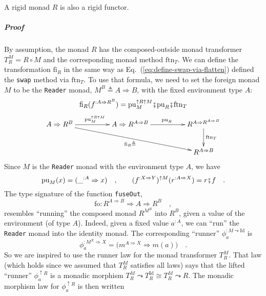 A rigid monad $R$ is also a rigid functor.

\subparagraph{Proof}

By assumption, the monad $R$ has the composed-outside monad transformer
$T_{R}^{M}=R\circ M$ and the corresponding monad method $\text{ftn}_{T}$.
We can define the transformation $\text{fi}_{R}$ in the same way
as Eq.~(\ref{eq:define-swap-via-flatten}) defined the \lstinline!swap!
method via $\text{ftn}_{T}$. To use that formula, we need to set
the foreign monad $M$ to be the \lstinline!Reader!
monad, $M^{B}\triangleq A\Rightarrow B$, with the fixed environment
type $A$:
\begin{equation}
\text{fi}_{R}(f^{:A\Rightarrow R^{B}})=\text{pu}_{M}^{\uparrow R\uparrow M}\bef\text{pu}_{R}\bef\text{ftn}_{T}\label{eq:rigid-monad-fuseIn-def}
\end{equation}
\[
\xymatrix{\xyScaleY{2pc}\xyScaleX{4pc}A\Rightarrow R^{B}\ar[r]\sp(0.5){\text{pu}_{M}^{\uparrow R\uparrow M}}\ar[rrd]\sb(0.5){\text{fi}_{R}\triangleq} & A\Rightarrow R^{A\Rightarrow B}\ar[r]\sp(0.5){\text{pu}_{R}} & R^{A\Rightarrow R^{A\Rightarrow B}}\ar[d]\sp(0.45){\text{ftn}_{T}}\\
 &  & R^{A\Rightarrow B}
}
\]
Since $M$ is the \lstinline!Reader!
monad with the environment type $A$, we have
\[
\text{pu}_{M}(x)=(\_^{:A}\Rightarrow x)\quad,\quad\quad(f^{:X\Rightarrow Y})^{\uparrow M}(r^{:A\Rightarrow X})=r\bef f\quad.
\]
The type signature of the function \lstinline!fuseOut!,
\[
\text{fo}:R^{A\Rightarrow B}\Rightarrow A\Rightarrow R^{B}\quad,
\]
resembles ``running'' the composed monad $R^{M^{B}}$ into $R^{B}$,
given a value of the environment (of type $A$). Indeed, given a fixed
value $a^{:A}$, we can ``run'' the \lstinline!Reader!
monad into the identity monad. The corresponding ``runner'' $\phi_{a}^{:M\leadsto\text{Id}}$
is
\begin{equation}
\phi_{a}^{:M^{X}\Rightarrow X}=\big(m^{A\Rightarrow X}\Rightarrow m(a)\big)\quad.\label{eq:runner-phi-def}
\end{equation}
So we are inspired to use the runner law for the monad transformer
$T_{R}^{M}$. That law (which holds since we assumed that $T_{R}^{M}$
satisfies all laws) says that the lifted ``runner'' $\phi_{a}^{\uparrow R}$
is a monadic morphism $T_{R}^{M}\leadsto T_{R}^{\text{Id}}\cong T_{R}^{M}\leadsto R$.
The monadic morphism law for $\phi_{a}^{\uparrow R}$ is then written
